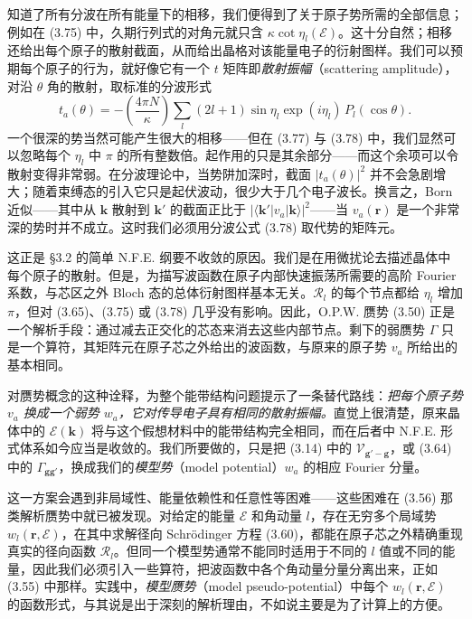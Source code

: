 知道了所有分波在所有能量下的相移，我们便得到了关于原子势所需的全部信息；例如在 (3.75) 中，久期行列式的对角元就只含 $\kappa\cot\eta_l(\mathcal{E})$。这十分自然；相移还给出每个原子的散射截面，从而给出晶格对该能量电子的衍射图样。我们可以预期每个原子的行为，就好像它有一个 $t$ 矩阵即\emph{散射振幅}（scattering amplitude），对沿 $\theta$ 角的散射，取标准的分波形式
\begin{equation*}
t_a(\theta)=-\left(\frac{4\pi N}{\kappa}\right)\sum_l(2l+1)\sin\eta_l\exp(i\eta_l)\,P_l(\cos\theta).\tag{3.78}
\end{equation*}
一个很深的势当然可能产生很大的相移——但在 (3.77) 与 (3.78) 中，我们显然可以忽略每个 $\eta_l$ 中 $\pi$ 的所有整数倍。起作用的只是其余部分——而这个余项可以令散射变得非常弱。在分波理论中，当势阱加深时，截面 $|t_a(\theta)|^2$ 并不会急剧增大；随着束缚态的引入它只是起伏波动，很少大于几个电子波长。换言之，Born 近似——其中从 $\mathbf{k}$ 散射到 $\mathbf{k}'$ 的截面正比于 $|\langle\mathbf{k}'|v_a|\mathbf{k}\rangle|^2$——当 $v_a(\mathbf{r})$ 是一个非常深的势时并不成立。这时我们必须用分波公式 (3.78) 取代势的矩阵元。

这正是 §3.2 的简单 N.F.E. 纲要不收敛的原因。我们是在用微扰论去描述晶体中每个原子的散射。但是，为描写波函数在原子内部快速振荡所需要的高阶 Fourier 系数，与芯区之外 Bloch 态的总体衍射图样基本无关。$\mathcal{R}_l$ 的每个节点都给 $\eta_l$ 增加 $\pi$，但对 (3.65)、(3.75) 或 (3.78) 几乎没有影响。因此，O.P.W. 赝势 (3.50) 正是一个解析手段：通过减去正交化的芯态来消去这些内部节点。剩下的弱赝势 $\Gamma$ 只是一个算符，其矩阵元在原子芯之外给出的波函数，与原来的原子势 $v_a$ 所给出的基本相同。


对赝势概念的这种诠释，为整个能带结构问题提示了一条替代路线：\emph{把每个原子势 $v_a$ 换成一个弱势 $w_a$，它对传导电子具有相同的散射振幅。}直觉上很清楚，原来晶体中的 $\mathcal{E}(\mathbf{k})$ 将与这个假想材料中的能带结构完全相同，而在后者中 N.F.E. 形式体系如今应当是收敛的。我们所要做的，只是把 (3.14) 中的 $\mathcal{V}_{\mathbf{g}'-\mathbf{g}}$，或
(3.64) 中的 $\Gamma_{\mathbf{gg}'}$，换成我们的\emph{模型势}（model potential）$w_a$ 的相应 Fourier 分量。

这一方案会遇到非局域性、能量依赖性和任意性等困难——这些困难在 (3.56) 那类解析赝势中就已被发现。对给定的能量 $\mathcal{E}$ 和角动量 $l$，存在无穷多个局域势 $w_l(\mathbf{r},\mathcal{E})$，在其中求解径向 Schrödinger 方程 (3.60)，都能在原子芯之外精确重现真实的径向函数 $\mathcal{R}_l$。但同一个模型势通常不能同时适用于不同的 $l$ 值或不同的能量，因此我们必须引入一些算符，把波函数中各个角动量分量分离出来，正如 (3.55) 中那样。实践中，\emph{模型赝势}（model pseudo-potential）中每个 $w_l(\mathbf{r},\mathcal{E})$ 的函数形式，与其说是出于深刻的解析理由，不如说主要是为了计算上的方便。

